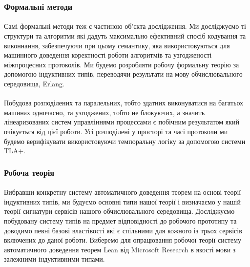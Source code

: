 \documentclass[11pt,oneside]{article}
\begin{document}
\newpage

\subsubsection{Формальні методи}
\vspace{0.5cm}

   \paragraph{}
   Самі формальні методи теж є частиною об’єкта дослідження. Ми досліджуємо ті структури
   та алгоритми які дадуть максимально ефективний спосіб кодування та виконнання,
   забезпечуючи при цьому семантику, яка використовуються для машинного доведення
   коректності роботи алгоритмів та узгодженості міжпроцесних протоколів.
   Ми будемо розробляти робочу формальну теорію за допомогою індуктивних типів,
   переводячи результати на мову обчислювального середовища, Erlang.

   \paragraph{}
   Побудова розподілених та паралельних, тобто здатних виконуватися на багатьох машинах одночасно, та
   узгоджених, тобто не блокуючих, а значить лінеаризованих систем управліннями процессами є побічним
   результатом який очікується від цієї роботи. Усі розподілені у просторі та часі
   протоколи ми будемо верифікувати використовуючи темпоральну логіку за допомогою системи TLA+.

\subsubsection{Робоча теорія}

   \paragraph{}
   Вибравши конкретну систему автоматичного доведення теорем на основі теорії індуктивних типів,
   ми будуємо основні типи нашої теорії і визначаємо у нашій теорії сигнатури сервісів
   нашого обчислювального середовища. Досліджуємо побудовану систему типів на предмет
   відповідності до робочого прототипу та доводимо певні базові властівості які є спільними для кожного із трьох
   сервісів включених до даної роботи. Виберемо для опрацювання робочої теорії
   систему автоматичного доведення теорем Lean від Microsoft Research в якості мови
   з залежними індуктивними типами.
\end{document}
